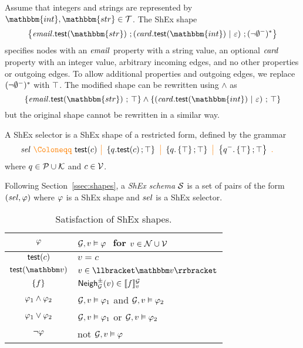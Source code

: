 \begin{example}
    Assume that integers and strings are represented by $\mathbbm{int},\mathbbm{str}\in \ValueTypes$.
    The ShEx shape
    \[ \shexneigh{\exemail.\shextest(\mathbbm{str}) \,\shexeach\, (\excard.\shextest(\mathbbm{int}) \,\shexone\, \varepsilon) \,\shexeach\, (\shexneginv{\emptyset})^{*}}
    \]
    specifies nodes with an $\mathit{email}$ property with a string value, an optional $\mathit{card}$ property with an integer value, arbitrary incoming edges, and no other properties or outgoing edges.
    To allow additional properties and outgoing edges, we replace $ (\neg{\emptyset^{-}})^{*}$ with $\top$.
    The modified shape can be rewritten using $\land$ as
    \[ \shexneigh{\exemail.\shextest(\mathbbm{str}) \,\shexeach\,\shexallte} \land \shexneigh{(\excard.\shextest(\mathbbm{int}) \,\shexone\, \varepsilon) \,\shexeach\, \shexallte}
    \] but the original shape cannot be rewritten in a similar way.
\end{example}


\begin{definition}
\label{def:shex-selector}
A ShEx selector is a ShEx shape  of a restricted form, defined by the grammar
\begin{align*}
\shexsel \gDef & \shexhasvalue(c)
    \gMid \shexneigh{q.\shexhasvalue(c) \shexeach \shexallte}
    \gMid %
    \shexneigh{q.\shextop \shexeach \shexallte}
    \gMid \shexneigh{\shexinverse q.\shextop \shexeach \shexallte}
    \gEnd
\end{align*}
where $q \in \mathcal{P} \cup \mathcal{K}$ and
$c \in \mathcal{V}$.
\end{definition}

Following Section~\ref{ssec:shapes}, a \emph{ShEx schema} $\mathcal{S}$ is a set of pairs of the form $(\mathit{sel}, \mathit{\varphi})$ where $\mathit{\varphi}$ is a ShEx shape and $\mathit{sel}$ is a ShEx selector.


\begin{table}
  \caption{Satisfaction of ShEx shapes.}
  \label{tab:semantics-shex-shape-expr}
  \centering
  \begin{tabular}{cl}
    \toprule
    $\mathit{\varphi}$ & $\mathcal{G}, v \vDash \mathit{\varphi}\ $ for $v\in\mathcal{N}\cup\mathcal{V}$ \\
    \midrule
    $\mathsf{test}(c)$ & $v = c$ \\
    $\shextest(\vtype)$ & $v \in \sem{\vtype}$ \\
    $\left\{ f \right\}$ & $\mathsf{Neigh}^\pm_{\mathcal{G}}(v) \in \llbracket{f}\rrbracket_v^{\mathcal{G}}$ \\
    $\mathit{\varphi}_1 \land \mathit{\varphi}_2$ & $\mathcal{G}, v \vDash \mathit{\varphi}_1$ and $\mathcal{G}, v \vDash \mathit{\varphi}_2$ \\
    $\mathit{\varphi}_1 \lor \mathit{\varphi}_2$ & $\mathcal{G}, v \vDash \mathit{\varphi}_1$ or $\mathcal{G}, v \vDash \mathit{\varphi}_2$ \\
    $\lnot \mathit{\varphi}$ & not $\mathcal{G}, v \vDash \mathit{\varphi}$ \\
    \bottomrule
  \end{tabular}
\end{table}


